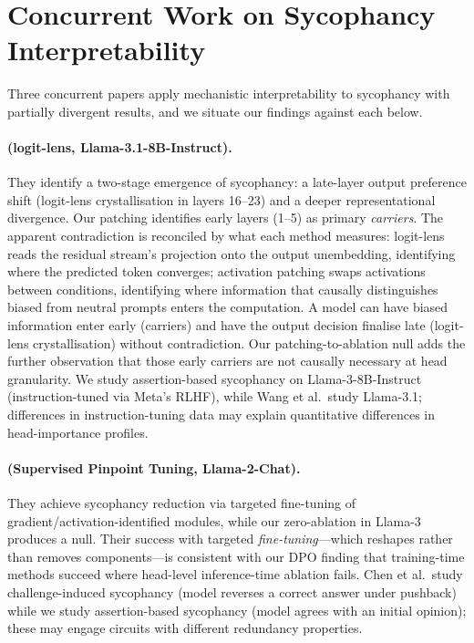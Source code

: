 \documentclass{article}
\begin{document}
\appendix


\section{Concurrent Work on Sycophancy Interpretability}
\label{app:concurrent}

Three concurrent papers apply mechanistic interpretability to sycophancy with partially divergent results, and we situate our findings against each below.

\paragraph{\citet{li2025truth} (logit-lens, Llama-3.1-8B-Instruct).} They identify a two-stage emergence of sycophancy: a late-layer output preference shift (logit-lens crystallisation in layers 16--23) and a deeper representational divergence. Our patching identifies early layers (1--5) as primary \emph{carriers}. The apparent contradiction is reconciled by what each method measures: logit-lens reads the residual stream's projection onto the output unembedding, identifying where the predicted token converges; activation patching swaps activations between conditions, identifying where information that causally distinguishes biased from neutral prompts enters the computation. A model can have biased information enter early (carriers) and have the output decision finalise late (logit-lens crystallisation) without contradiction. Our patching-to-ablation null adds the further observation that those early carriers are not causally necessary at head granularity. We study assertion-based sycophancy on Llama-3-8B-Instruct (instruction-tuned via Meta's RLHF), while Wang et al.\ study Llama-3.1; differences in instruction-tuning data may explain quantitative differences in head-importance profiles.

\paragraph{\citet{chen2024pinpoint} (Supervised Pinpoint Tuning, Llama-2-Chat).} They achieve sycophancy reduction via targeted fine-tuning of gradient/activation-identified modules, while our zero-ablation in Llama-3 produces a null. Their success with targeted \emph{fine-tuning}---which reshapes rather than removes components---is consistent with our DPO finding that training-time methods succeed where head-level inference-time ablation fails. Chen et al.\ study challenge-induced sycophancy (model reverses a correct answer under pushback) while we study assertion-based sycophancy (model agrees with an initial opinion); these may engage circuits with different redundancy properties.
\end{document}
